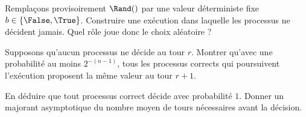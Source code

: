 \begin{exercice}
\begin{questions}
  \item Remplaçons provisoirement $\Rand()$ par une valeur déterministe fixe
    $b \in \{\False, \True\}$.
    Construire une exécution dans laquelle les processus ne décident jamais.
    Quel rôle joue donc le choix aléatoire ?

  \item Supposons qu'aucun processus ne décide au tour $r$.
    Montrer qu'avec une probabilité au moins $2^{-(n-1)}$, tous les processus
    corrects qui poursuivent l'exécution proposent la même valeur au tour
    $r+1$.

  \item En déduire que tout processus correct décide avec probabilité $1$.
    Donner un majorant asymptotique du nombre moyen de tours nécessaires
    avant la décision.

  \end{questions}

\end{exercice}

\endgroup
\endinput
